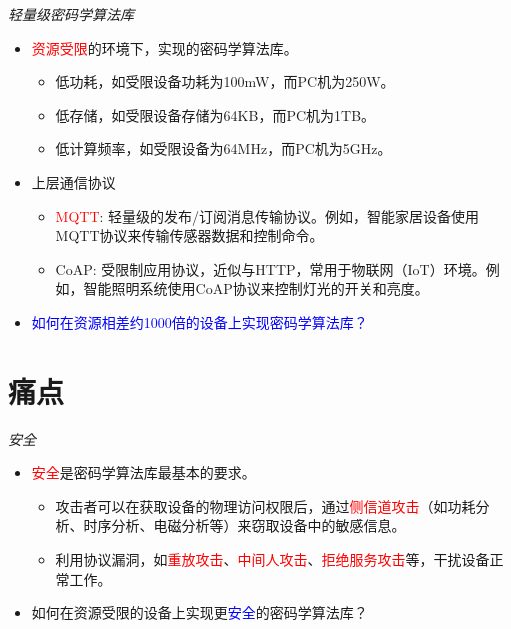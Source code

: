 \documentclass{beamer}
\begin{document}
\begin{frame}{\textit{轻量级密码学算法库}}
    \begin{itemize}
        \item \textcolor{red}{资源受限}的环境下，实现的密码学算法库。
              \begin{itemize}
                  \item 低功耗，如受限设备功耗为100mW，而PC机为250W。
                  \item 低存储，如受限设备存储为64KB，而PC机为1TB。
                  \item 低计算频率，如受限设备为64MHz，而PC机为5GHz。
              \end{itemize}
        \item 上层通信协议
              \begin{itemize}
                  \item \textcolor{red}{MQTT}: 轻量级的发布/订阅消息传输协议。例如，智能家居设备使用MQTT协议来传输传感器数据和控制命令。
                  \item CoAP: 受限制应用协议，近似与HTTP，常用于物联网（IoT）环境。例如，智能照明系统使用CoAP协议来控制灯光的开关和亮度。
              \end{itemize}
        \item \textcolor{blue}{如何在资源相差约1000倍的设备上实现密码学算法库？}
    \end{itemize}
\end{frame}

\section{痛点}

\begin{frame}{\textit{安全}}
    \begin{itemize}
        \item \textcolor{red}{安全}是密码学算法库最基本的要求。
              \begin{itemize}
                  \item 攻击者可以在获取设备的物理访问权限后，通过\textcolor{red}{侧信道攻击}（如功耗分析、时序分析、电磁分析等）来窃取设备中的敏感信息。
                  \item 利用协议漏洞，如\textcolor{red}{重放攻击}、\textcolor{red}{中间人攻击}、\textcolor{red}{拒绝服务攻击}等，干扰设备正常工作。
              \end{itemize}
        \item 如何在资源受限的设备上实现更\textcolor{blue}{安全}的密码学算法库？
    \end{itemize}
\end{frame}
\end{document}

